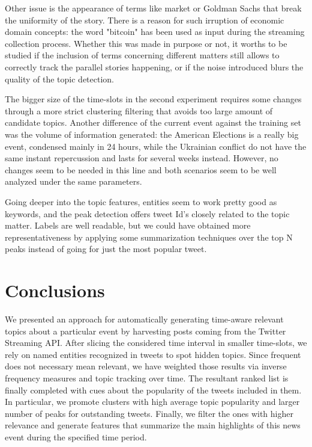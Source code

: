 \documentclass{sig-alternate}
\begin{document}
Other issue is the appearance of terms like market or Goldman Sachs that break the uniformity of the story. There is a reason for such irruption of economic domain concepts: the word "bitcoin" has been used as input during the streaming collection process. Whether this was made in purpose or not, it worths to be studied if the inclusion of terms concerning different matters still allows to correctly track the parallel stories happening, or if the noise introduced blurs the quality of the topic detection. 

The bigger size of the time-slots in the second experiment requires some changes through a more strict clustering filtering that avoids too large amount of candidate topics. Another difference of the current event against the training set was the volume of information generated: the American Elections is a really big event, condensed mainly in 24 hours, while the Ukrainian conflict do not have the same instant repercussion and lasts for several weeks instead. However, no changes seem to be needed in this line and both scenarios seem to be well analyzed under the same parameters. 

Going deeper into the topic features, entities seem to work pretty good as keywords, and the peak detection offers tweet Id's closely related to the topic matter. Labels are well readable, but we could have obtained more representativeness by applying some summarization techniques over the top N peaks instead of going for just the most popular tweet.



\section{Conclusions}
We presented an approach for automatically generating time-aware relevant topics about a particular event by harvesting posts coming from the Twitter Streaming API. After slicing the considered time interval in smaller time-slots, we rely on named entities recognized in tweets to spot hidden topics. Since frequent does not necessary mean relevant, we have weighted those results via inverse frequency measures and topic tracking over time. The resultant ranked list is finally completed with cues about the popularity of the tweets included in them. In particular, we promote clusters with high average topic popularity and larger number of peaks for outstanding tweets. Finally, we filter the ones with higher relevance and generate features that summarize the main highlights of this news event during the specified time period.
\end{document}
